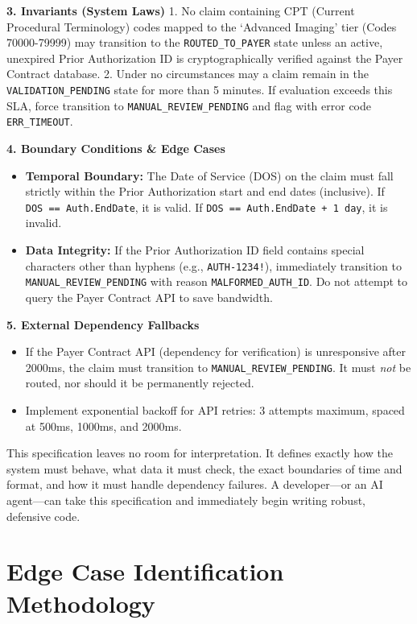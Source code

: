 \documentclass[
  11pt,
  openany,
  oneside]{book}
\providecommand{\tightlist}{%
  \setlength{\itemsep}{0pt}\setlength{\parskip}{0pt}}
\begin{document}
\textbf{3. Invariants (System Laws)} 1. No claim containing CPT (Current
Procedural Terminology) codes mapped to the `Advanced Imaging' tier
(Codes 70000-79999) may transition to the \texttt{ROUTED\_TO\_PAYER}
state unless an active, unexpired Prior Authorization ID is
cryptographically verified against the Payer Contract database. 2. Under
no circumstances may a claim remain in the \texttt{VALIDATION\_PENDING}
state for more than 5 minutes. If evaluation exceeds this SLA, force
transition to \texttt{MANUAL\_REVIEW\_PENDING} and flag with error code
\texttt{ERR\_TIMEOUT}.

\textbf{4. Boundary Conditions \& Edge Cases}

\begin{itemize}
\tightlist
\item
  \textbf{Temporal Boundary:} The Date of Service (DOS) on the claim
  must fall strictly within the Prior Authorization start and end dates
  (inclusive). If \texttt{DOS\ ==\ Auth.EndDate}, it is valid. If
  \texttt{DOS\ ==\ Auth.EndDate\ +\ 1\ day}, it is invalid.
\item
  \textbf{Data Integrity:} If the Prior Authorization ID field contains
  special characters other than hyphens (e.g., \texttt{AUTH-1234!}),
  immediately transition to \texttt{MANUAL\_REVIEW\_PENDING} with reason
  \texttt{MALFORMED\_AUTH\_ID}. Do not attempt to query the Payer
  Contract API to save bandwidth.
\end{itemize}

\textbf{5. External Dependency Fallbacks}

\begin{itemize}
\tightlist
\item
  If the Payer Contract API (dependency for verification) is
  unresponsive after 2000ms, the claim must transition to
  \texttt{MANUAL\_REVIEW\_PENDING}. It must \emph{not} be routed, nor
  should it be permanently rejected.
\item
  Implement exponential backoff for API retries: 3 attempts maximum,
  spaced at 500ms, 1000ms, and 2000ms.
\end{itemize}

This specification leaves no room for interpretation. It defines exactly
how the system must behave, what data it must check, the exact
boundaries of time and format, and how it must handle dependency
failures. A developer---or an AI agent---can take this specification and
immediately begin writing robust, defensive code.

\section{Edge Case Identification
Methodology}\label{edge-case-identification-methodology}
\end{document}
